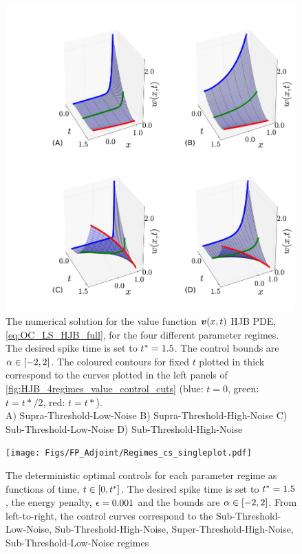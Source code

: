 \begin{figure}[h!] 
\begin{center} 
\includegraphics[width=0.99\textwidth]{Figs/HJB/Regimes_valuesurf.pdf} 
\caption{The numerical solution for the value function ${ \boldsymbol{v} }(x,t)$ HJB PDE, 
\cref{eq:OC_LS_HJB_full}, for the four different parameter regimes. 
The desired spike time is set to ${ t^* }=1.5$. 
The control bounds are ${\alpha} \in [-2,2]$.  
The coloured contours for fixed $t$ plotted in thick correspond to the 
curves plotted in the left panels of \cref{fig:HJB_4regimes_value_control_cuts} 
(blue: $t=0$, green: $t=t*/2$, red: $t=t*$). 
\\ 
A) Supra-Threshold-Low-Noise 
B) Supra-Threshold-High-Noise 
C) Sub-Threshold-Low-Noise  
D) Sub-Threshold-High-Noise  } 
\label{fig:HJB_4regimes_value_surf} 
\end{center} 
\end{figure} 
\begin{figure}[htp] 
\begin{center} 
  \texttt{[image: Figs/FP\_Adjoint/Regimes\_cs\_singleplot.pdf]} 
  \caption[labelInTOC]{The deterministic optimal controls for each parameter 
  regime as functions of time, $t \in [0, { t^* }]$. 
  The desired spike time is set to ${ t^* }=1.5$, the energy penalty, ${\epsilon} 
  = 0.001$ and the bounds are ${\alpha} \in [-2,2]$. 
  From left-to-right, the control curves correspond to the 
  Sub-Threshold-Low-Noise, Sub-Threshold-High-Noise, Super-Threshold-High-Noise, 
  Sub-Threshold-Low-Noise regimes 
  } 
  \label{fig:FBK_Regimes_cs} 
\end{center}   
\end{figure}    
